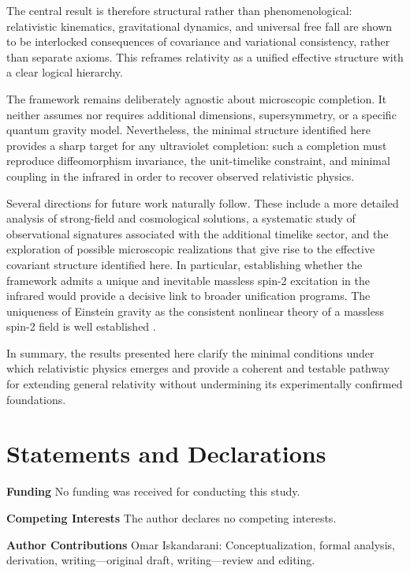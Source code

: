 \documentclass[11pt]{article}
\begin{document}
    The central result is therefore structural rather than phenomenological:
    relativistic kinematics, gravitational dynamics, and universal free fall are
    shown to be interlocked consequences of covariance and variational consistency,
    rather than separate axioms.
    This reframes relativity as a unified effective structure with a clear logical
    hierarchy.

    The framework remains deliberately agnostic about microscopic completion.
    It neither assumes nor requires additional dimensions, supersymmetry, or a
    specific quantum gravity model.
    Nevertheless, the minimal structure identified here provides a sharp target for
    any ultraviolet completion: such a completion must reproduce diffeomorphism
    invariance, the unit-timelike constraint, and minimal coupling in the infrared
    in order to recover observed relativistic physics.

    Several directions for future work naturally follow.
    These include a more detailed analysis of strong-field and cosmological
    solutions, a systematic study of observational signatures associated with the
    additional timelike sector, and the exploration of possible microscopic
    realizations that give rise to the effective covariant structure identified
    here.
    In particular, establishing whether the framework admits a unique and inevitable
    massless spin-2 excitation in the infrared would provide a decisive link to
    broader unification programs.
    The uniqueness of Einstein gravity as the consistent nonlinear theory of a
    massless spin-2 field is well established
    \cite{weinberg1965,deser1970}.

    In summary, the results presented here clarify the minimal conditions under
    which relativistic physics emerges and provide a coherent and testable pathway
    for extending general relativity without undermining its experimentally
    confirmed foundations.
    
    \section*{Statements and Declarations}
    
    \textbf{Funding} No funding was received for conducting this study.
    
    \textbf{Competing Interests} The author declares no competing interests.
    
    \textbf{Author Contributions} Omar Iskandarani: Conceptualization, formal analysis, derivation, writing---original draft, writing---review and editing.
    
\end{document}
